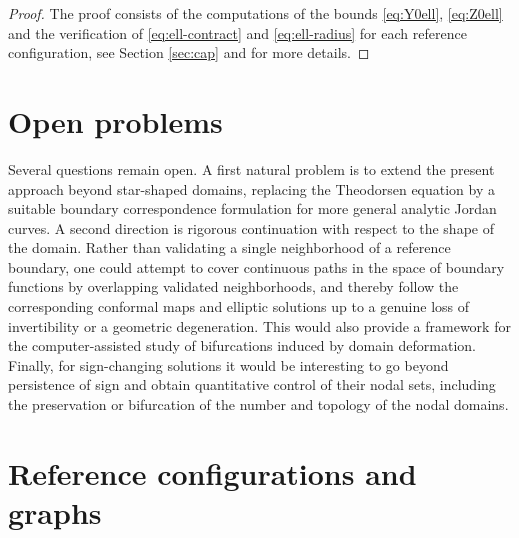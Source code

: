 \documentclass[11pt,a4paper]{amsart}
\begin{document}
\begin{proof}
	The proof consists of the computations of the bounds \eqref{eq:Y0ell}, \eqref{eq:Z0ell} and the verification of   \eqref{eq:ell-contract} and \eqref{eq:ell-radius}
	for each reference configuration, see Section \ref{sec:cap} and \cite{program} for more details.
\end{proof}

\section{Open problems}
\label{sec:open}
Several questions remain open. A first natural problem is to extend the present approach beyond star-shaped domains, replacing the Theodorsen equation by a suitable boundary correspondence formulation for more general analytic Jordan curves. A second direction is rigorous continuation with respect to the shape of the domain. Rather than validating a single neighborhood of a reference boundary, one could attempt to cover continuous paths in the space of boundary functions by overlapping validated neighborhoods, and thereby follow the corresponding conformal maps and elliptic solutions up to a genuine loss of invertibility or a geometric degeneration. This would also provide a framework for the computer-assisted study of bifurcations induced by domain deformation. Finally, for sign-changing solutions it would be interesting to go beyond persistence of sign and obtain quantitative control of their nodal sets, including the preservation or bifurcation of the number and topology of the nodal domains.


\section{Reference configurations and graphs}
\label{sec:pics}
\end{document}
